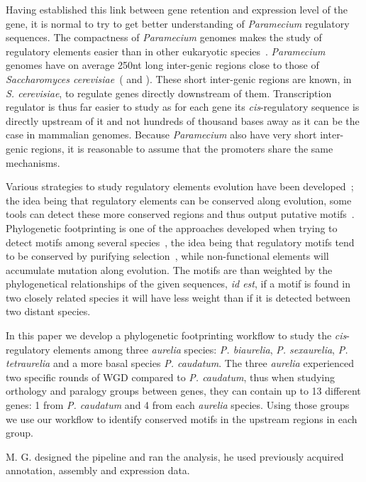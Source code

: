 Having established this link between gene retention and expression level of the gene, it is normal to try to get better understanding of \textit{Paramecium} regulatory sequences. The compactness of \textit{Paramecium} genomes makes the study of regulatory elements easier than in other eukaryotic species~\citep{mcgrath_insights_2014}. \textit{Paramecium} genomes have on average 250nt long inter-genic regions close to those of \textit{Saccharomyces cerevisiae}~(\citealt{chen_minimal_2011} and \citealt{hahn_transcriptional_2011}). These short inter-genic regions are known, in \textit{S. cerevisiae}, to regulate genes directly downstream of them. Transcription regulator is thus far easier to study as for each gene its \textit{cis}-regulatory sequence is directly upstream of it and not hundreds of thousand bases away as it can be the case in mammalian genomes. Because \textit{Paramecium} also have very short inter-genic regions, it is reasonable to assume that the promoters share the same mechanisms.

Various strategies to study regulatory elements evolution have been developed~\citep{wittkopp_cis-regulatory_2012}; the idea being that regulatory elements can be conserved along evolution, some tools can detect these more conserved regions and thus output putative motifs~\citep{dhaeseleer_how_2006}. Phylogenetic footprinting is one of the approaches developed when trying to detect motifs among several species~\citep{zhang_mice_2003}, the idea being that regulatory motifs tend to be conserved by purifying selection~\citep{nelson_conserved_2013}, while non-functional elements will accumulate mutation along evolution. The motifs are than weighted by the phylogenetical relationships of the given sequences, \textit{id est}, if a motif is found in two closely related species it will have less weight than if it is detected between two distant species.

In this paper we develop a phylogenetic footprinting workflow to study the \textit{cis}-regulatory elements among three \textit{aurelia} species: \textit{P. biaurelia}, \textit{P. sexaurelia}, \textit{P. tetraurelia} and a more basal species \textit{P. caudatum}. The three \textit{aurelia} experienced two specific rounds of WGD compared to \textit{P. caudatum}, thus when studying orthology and paralogy groups between genes, they can contain up to 13 different genes: 1 from \textit{P. caudatum} and 4 from each \textit{aurelia} species. Using those groups we use our workflow to identify conserved motifs in the upstream regions in each group.

M. G. designed the pipeline and ran the analysis, he used previously acquired annotation, assembly and expression data.

